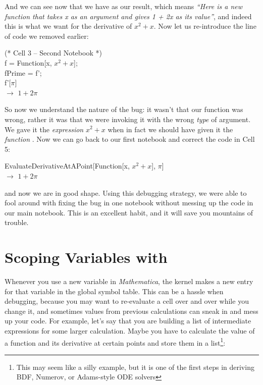 And we can see now that we have  as our result, which means \emph{``Here is a new function that takes x as an argument and gives 1 + 2x as its value''}, and indeed this is what we want for the derivative of $x^2 + x$. Now let us re-introduce the line of code we removed earlier:

\begin{code}
	   (* Cell 3 -- Second Notebook *)\\
	   f = Function[x, $x^2 + x$];\\
	   fPrime = f';\\
	   f'[$\pi$]\\
	   $\rightarrow$ $1 + 2\pi$
\end{code}

So now we understand the nature of the bug: it wasn't that our  function was wrong, rather it was that we were invoking it with the wrong \emph{type} of argument. We gave it the \emph{expression} $x^2 + x$ when in fact we should have given it the \emph{function} . Now we can go back to our first notebook and correct the code in Cell 5:

\begin{code}
	   EvaluateDerivativeAtAPoint[Function[x, $x^2 + x$], $\pi$]\\
	   $\rightarrow$ $1 + 2\pi$
\end{code}

and now we are in good shape. Using this debugging strategy, we were able to fool around with fixing the bug in one notebook without messing up the code in our main notebook. This is an excellent habit, and it will save you mountains of trouble.

\section{Scoping Variables with }
\label{sec:Scope}

Whenever you use a new variable in  \emph{Mathematica}, the kernel makes a new entry for that variable in the global symbol table. This can be a hassle when debugging, because you may want to re-evaluate a cell over and over while you change it, and sometimes values from previous calculations can sneak in and mess up your code. For example, let's say that you are building a list of intermediate expressions for some larger calculation. Maybe you have to calculate the value of a function and its derivative at certain points and store them in a list\footnote{This may seem like a silly example, but it is one of the first steps in deriving BDF, Numerov, or Adams-style ODE solvers}:

